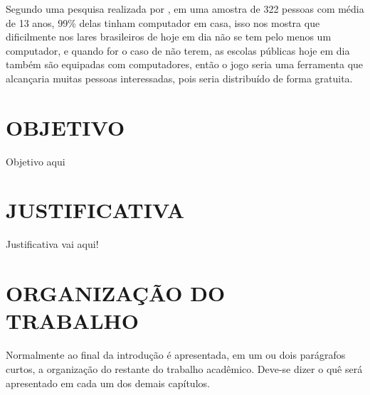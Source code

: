 Segundo uma pesquisa realizada por \cite{Cruz2012}, em uma amostra de 322 pessoas com média de 13 anos, 99\% delas tinham computador em casa, isso nos mostra que dificilmente nos lares brasileiros de hoje em dia não se tem pelo menos um computador, e quando for o caso de não terem, as escolas públicas hoje em dia também são equipadas com computadores, então o jogo seria uma ferramenta que alcançaria muitas pessoas interessadas, pois seria distribuído de forma gratuita.  




\section{OBJETIVO}
\label{sec:objetivo}

Objetivo aqui

\section{JUSTIFICATIVA}
\label{sec:justificativa}

Justificativa vai aqui!

\section{ORGANIZAÇÃO DO TRABALHO}
\label{sec:organizacaoTrabalho}

Normalmente ao final da introdução é apresentada, em um ou dois parágrafos curtos, a organização do restante do trabalho acadêmico.
Deve-se dizer o quê será apresentado em cada um dos demais capítulos.

